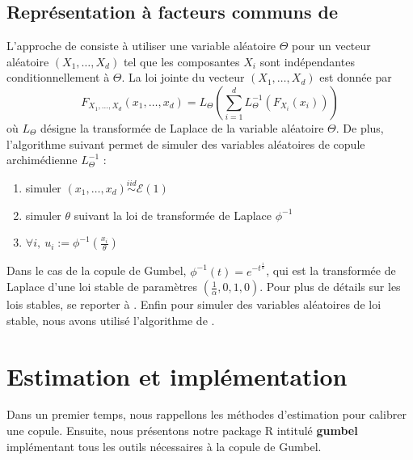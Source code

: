 \documentclass[11pt]{article}
\newcommand{\pkg}{\textbf}
\newcommand{\soft}{\textsf}
\begin{document}
\subsection[Repr\'esentation \`a facteurs communs]{Repr\'esentation \`a facteurs communs de \cite{marshall}}
L'approche de \cite{marshall} consiste \`a utiliser une variable al\'eatoire $\Theta$ pour un vecteur al\'eatoire $(X_1, \dots, X_d)$ tel que les composantes $X_i$ sont ind\'ependantes conditionnellement \`a $\Theta$. La loi jointe du vecteur $(X_1, \dots, X_d)$ est donn\'ee par
$$
F_{X_1, \dots, X_d}(x_1, \dots, x_d)=L_\Theta\left( \sum_{i=1}^d L^{-1}_\Theta\left(F_{X_i}(x_i)\right) \right)
$$
o\`u $L_\Theta$ d\'esigne la transform\'ee de Laplace de la variable al\'eatoire $\Theta$. De plus, l'algorithme suivant permet de simuler des variables al\'eatoires de copule archim\'edienne $L^{-1}_\Theta$ :
\begin{enumerate}
\item simuler $(x_1,\dots,x_d)\stackrel{iid}{\sim} \mathcal E(1)$
\item simuler $\theta$ suivant la loi de transform\'ee de Laplace $\phi^{-1}$
\item $\forall i,~ u_i := \phi^{-1}\left(\frac{x_i}{\theta}\right)$
\end{enumerate}
Dans le cas de la copule de Gumbel, $\phi^{-1}(t)=e^{-t^{\frac{1}{\alpha}}}$, qui est la transform\'ee de Laplace d'une loi stable de param\`etres $(\frac{1}{\alpha},0,1,0)$. Pour plus de d\'etails sur les lois stables, se reporter \`a \cite{nolan}. Enfin pour simuler des variables al\'eatoires de loi stable, nous avons utilis\'e l'algorithme de \cite{chambers}.

% 
% 
% 

\section{Estimation et impl\'ementation}
Dans un premier temps, nous rappellons les m\'ethodes d'estimation pour calibrer une copule.
Ensuite, nous pr\'esentons notre package \soft{R} intitul\'e \pkg{gumbel} impl\'ementant tous les outils
n\'ecessaires \`a la copule de Gumbel.
\end{document}
